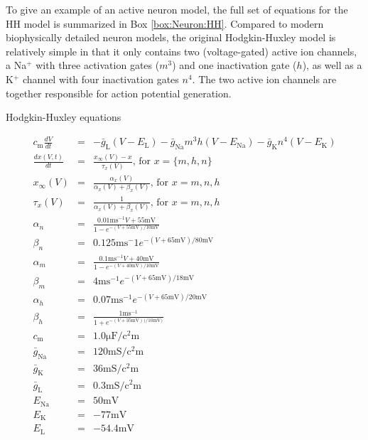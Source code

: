 To give an example of an active neuron model, the full set of equations for the HH model is summarized in Box \ref{box:Neuron:HH}. Compared to modern biophysically detailed neuron models, the original Hodgkin-Huxley model is relatively simple in that it only contains two (voltage-gated) active ion channels, a Na$^+$ with three activation gates ($m^3$) and one inactivation gate ($h$), as well as a K$^+$ channel with four inactivation gates $n^4$. The two active ion channels are together responsible for action potential generation.  

\begin{floatingbox}[h]
\caption{Hodgkin-Huxley equations}

\begin{eqnarray*}
    c_{\mathrm{m}} \frac{dV}{dt} & =  & -\bar{g}_{\mathrm{L}}(V-E_{\mathrm{L}}) - \bar{g}_{\mathrm{Na}} m^3 h (V - E_{\mathrm{Na}}) - \bar{g}_{\mathrm{K}} n^4 (V - E_{\mathrm{K}}) \\
    \frac{dx(V,t)}{dt} & = & \frac{x_{\infty}(V) - x}{\tau_x(V)},  \, \text{for } x = \{m,h,n\} \\ 
    x_{\infty}(V) &= & \frac{\alpha_x(V)}{\alpha_x(V) + \beta_x(V)}, \, \text{for } x = m,n,h \\ %
    \tau_x(V) & = & \frac{1}{\alpha_x(V) + \beta_x(V)}, \, \text{for } x = m,n,h \\ %
    \alpha_n &=& \frac{0.01 \mathrm{ms}^{-1} V+55 \si{\milli\volt}}{1-e^{-(V+55 \si{\milli\volt})/10 \si{\milli\volt}}}  \\ %
     \beta_n &=& 0.125 \mathrm{ms}^-1 e^{-(V+65 \si{\milli\volt})/80 \si{\milli\volt}}   \\ %
     \alpha_m &=& \frac{0.1 \mathrm{ms}^{-1} V+ 40 \si{\milli\volt}} {1-e^{-(V+40 \si{\milli\volt})/10 \si{\milli\volt}}}  \\   
     \beta_m &=& 4 \mathrm{ms}^{-1} e^{-(V+65  \si{\milli\volt})/18 \si{\milli\volt}}  \\ %
    \alpha_h &=& 0.07 \mathrm{ms}^{-1} e^{-(V+65 \si{\milli\volt})/20 \si{\milli\volt}}  \\ %
    \beta_h &=& \frac{1 \mathrm{ms}^{-1}}{1+e^{-(V+35 \si{\milli\volt}))/10 \si{\milli\volt})}}   \\ %
    c_\mathrm{m} &=& 1.0 \si{\micro\farad\per\square\centi\metre} \\ %
    \bar{g}_{\mathrm{Na}} &=& 120 \si{\milli\siemens\per\square\centi\metre}\\ %
    \bar{g}_{\mathrm{K}} &=& 36 \si{\milli\siemens\per\square\centi\metre} \\ %
    \bar{g}_{\mathrm{L}} &=& 0.3 \si{\milli\siemens\per\square\centi\metre} \\ %
    E_{\mathrm{Na}} &=& 50 \si{\milli\volt} \\ %
    E_{\mathrm{K}} &=& -77  \si{\milli\volt} \\ %
    E_{\mathrm{L}} &=& -54.4 \si{\milli\volt} \\ %
\end{eqnarray*}
\label{box:Neuron:HH}
\end{floatingbox}



